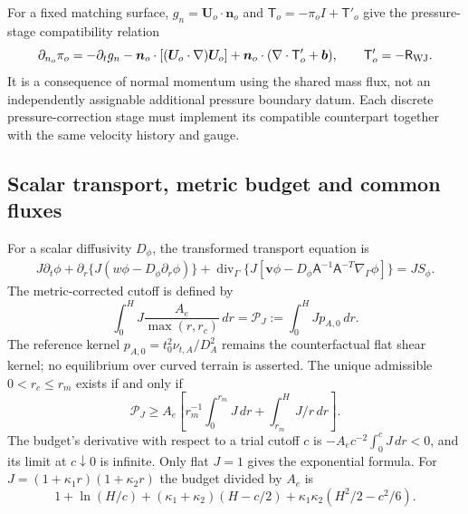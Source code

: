 \documentclass[11pt,a4paper]{article}
\numberwithin{equation}{section}
\begin{document}
For a fixed matching surface, $g_n=\bm U_o\cdot\bm n_o$ and
$\mathsf T_o=-\pi_oI+\mathsf T'_o$ give the pressure-stage
compatibility relation
\begin{equation}
 \partial_{n_o}\pi_o=-\partial_tg_n
 -\bm n_o\cdot[(\bm U_o\cdot\nabla)\bm U_o]
 +\bm n_o\cdot(\nabla\cdot\mathsf T'_o+\bm b),
 \qquad \mathsf T'_o=-\mathsf R_{\rm WJ}.
 \label{eq:wj-wall-pressure-stage}
\end{equation}
It is a consequence of normal momentum using the shared mass flux,
not an independently assignable additional pressure boundary datum.
Each discrete pressure-correction stage must implement its compatible
counterpart together with the same velocity history and gauge.

\subsection{Scalar transport, metric budget and common fluxes}
For a scalar diffusivity $D_\phi$, the transformed transport equation is
\begin{equation}
 \begin{aligned}
 J\partial_t\phi+\partial_r\{J(w\phi-D_\phi\partial_r\phi)\}
 +\operatorname{div}_\Gamma\{J[\bm v\phi
 -D_\phi\mathsf A^{-1}\mathsf A^{-T}\nabla_\Gamma\phi]\}
 =JS_\phi.
 \end{aligned}
 \label{eq:wj-wall-curved-scalar}
\end{equation}
The metric-corrected cutoff is defined by
\begin{equation}
 \int_0^HJ\frac{A_e}{\max(r,r_c)}\,dr
 =\mathcal P_J:=\int_0^HJp_{A,0}\,dr.
 \label{eq:wj-wall-metric-budget}
\end{equation}
The reference kernel $p_{A,0}=t_0^2\nu_{t,A}/D_A^2$ remains the
counterfactual flat shear kernel; no equilibrium over curved terrain is
asserted. The unique admissible $0<r_c\leq r_m$ exists if and only if
\begin{equation}
 \boxed{\mathcal P_J\geq A_e\left[
 r_m^{-1}\int_0^{r_m}J\,dr+\int_{r_m}^H J/r\,dr\right].}
 \label{eq:wj-wall-metric-gate}
\end{equation}
The budget's derivative with respect to a trial cutoff $c$ is
$-A_e c^{-2}\int_0^cJ\,dr<0$, and its limit at $c\downarrow0$ is
infinite. Only flat $J=1$ gives the exponential formula. For
$J=(1+\kappa_1r)(1+\kappa_2r)$ the budget divided by $A_e$ is
\begin{equation}
 1+\ln(H/c)+(\kappa_1+\kappa_2)(H-c/2)
 +\kappa_1\kappa_2(H^2/2-c^2/6).
 \label{eq:wj-wall-metric-budget-explicit}
\end{equation}
\end{document}
